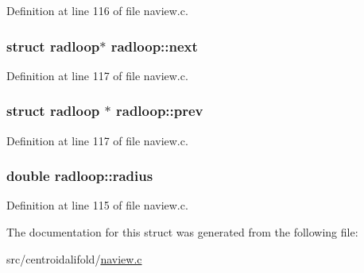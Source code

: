 Definition at line 116 of file naview.\+c.

\hypertarget{structradloop_a07f6e1a0e19e5a7e03a9e831e8300d37}{
\subsubsection[{next}]{\setlength{\rightskip}{0pt plus 5cm}struct {\bf radloop}$\ast$ radloop\+::next}}\label{structradloop_a07f6e1a0e19e5a7e03a9e831e8300d37}


Definition at line 117 of file naview.\+c.

\hypertarget{structradloop_acdcfc14a34e3316c6ecc01efcf5a8e46}{
\subsubsection[{prev}]{\setlength{\rightskip}{0pt plus 5cm}struct {\bf radloop} $\ast$ radloop\+::prev}}\label{structradloop_acdcfc14a34e3316c6ecc01efcf5a8e46}


Definition at line 117 of file naview.\+c.

\hypertarget{structradloop_ae48cb0dfffdc71d27f415e7cfa5c6686}{
\subsubsection[{radius}]{\setlength{\rightskip}{0pt plus 5cm}double radloop\+::radius}}\label{structradloop_ae48cb0dfffdc71d27f415e7cfa5c6686}


Definition at line 115 of file naview.\+c.



The documentation for this struct was generated from the following file\+:\begin{DoxyCompactItemize}
\item 
src/centroidalifold/\hyperlink{naview_8c}{naview.\+c}\end{DoxyCompactItemize}
